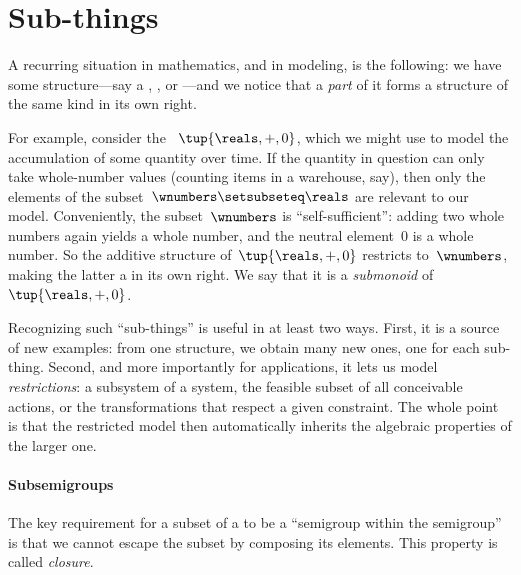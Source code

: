 
\section{Sub-things}
\label{sec:subthings-algebra}


A recurring situation in mathematics, and in modeling, is the following: we have some structure---say a , , or ---and we notice that a \emph{part} of it forms a structure of the same kind in its own right.

For example, consider the ~$\tup{\reals, +, 0}$, which we might use to model the accumulation of some quantity over time.
If the quantity in question can only take whole-number values (counting items in a warehouse, say), then only the elements of the subset~$\wnumbers \setsubseteq \reals$ are relevant to our model.
Conveniently, the subset~$\wnumbers$ is ``self-sufficient'': adding two whole numbers again yields a whole number, and the neutral element~$0$ is a whole number.
So the additive structure of~$\tup{\reals, +, 0}$ restricts to~$\wnumbers$, making the latter a  in its own right.
We say that it is a \emph{submonoid} of~$\tup{\reals, +, 0}$.

Recognizing such ``sub-things'' is useful in at least two ways.
First, it is a source of new examples: from one structure, we obtain many new ones, one for each sub-thing.
Second, and more importantly for applications, it lets us model \emph{restrictions}: a subsystem of a system, the feasible subset of all conceivable actions, or the transformations that respect a given constraint.
The whole point is that the restricted model then automatically inherits the algebraic properties of the larger one.

\paragraph{Subsemigroups}

The key requirement for a subset of a  to be a ``semigroup within the semigroup'' is that we cannot escape the subset by composing its elements.
This property is called \emph{closure}.

